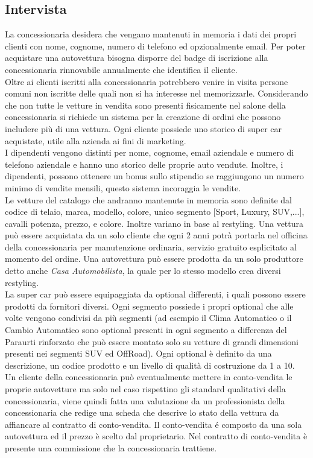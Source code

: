 \documentclass[12pt]{article}
\begin{document}
\subsection{Intervista}
La concessionaria desidera che vengano mantenuti in memoria i dati dei propri
clienti con nome, cognome, numero di telefono ed opzionalmente email. Per poter
acquistare una autovettura bisogna disporre del badge di iscrizione alla
concessionaria rinnovabile annualmente che identifica il cliente.\\
Oltre ai clienti iscritti alla concessionaria potrebbero venire in visita
persone comuni non iscritte delle quali non si ha interesse nel memorizzarle.
Considerando che non tutte le vetture in vendita sono presenti fisicamente nel
salone della concessionaria si richiede un sistema per la creazione di ordini
che possono includere più di una vettura. Ogni cliente possiede uno storico di
super car acquistate, utile alla azienda ai fini di marketing.\\
I dipendenti vengono distinti per nome, cognome, email aziendale e numero di
telefono aziendale e hanno uno storico delle proprie auto vendute. Inoltre, i
dipendenti, possono ottenere un bonus sullo stipendio se raggiungono un numero
minimo di vendite mensili, questo sistema incoraggia le vendite.\\
Le vetture del catalogo che andranno mantenute in memoria sono definite dal
codice di telaio, marca, modello, colore, unico segmento [Sport, Luxury,
SUV,...], cavalli potenza, prezzo, e colore. Inoltre variano in base al
restyling. Una vettura può essere acquistata da un solo cliente che ogni 2 anni
potrà portarla nel officina della concessionaria per manutenzione ordinaria,
servizio gratuito esplicitato al momento del ordine. Una autovettura può essere
prodotta da un solo produttore detto anche \textit{Casa Automobilista}, la quale
per lo stesso modello crea diversi restyling.\\
La super car può essere equipaggiata da optional differenti, i quali possono
essere prodotti da fornitori diversi. Ogni segmento possiede i propri optional
che alle volte vengono condivisi da più segmenti (ad esempio il Clima Automatico
o il Cambio Automatico sono optional presenti in ogni segmento a differenza del
Paraurti rinforzato che può essere montato solo su vetture di grandi dimensioni
presenti nei segmenti SUV ed OffRoad). Ogni optional è definito da una
descrizione, un codice prodotto e un livello di qualità di costruzione da 1 a
10.\\
Un cliente della concessionaria può eventualmente mettere in conto-vendita le
proprie autovetture ma solo nel caso rispettino gli standard qualitativi della
concessionaria, viene quindi fatta una valutazione da un professionista della
concessionaria che redige una scheda che descrive lo stato della vettura da
affiancare al contratto di conto-vendita. Il conto-vendita é composto da una
sola autovettura ed il prezzo è scelto dal proprietario. Nel contratto di
conto-vendita è presente una commissione che la concessionaria trattiene.
\end{document}
